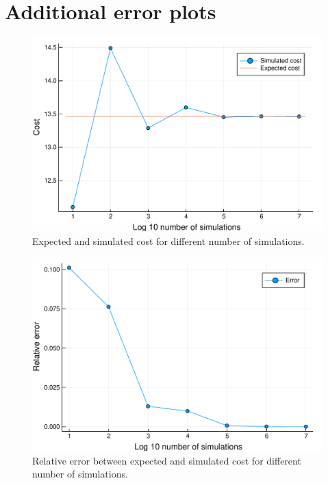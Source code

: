 \section{Additional error plots} %
\label{app:additional_error_plots}

\begin{figure}[H]
  \begin{center}
    \includegraphics[scale=0.41]{../img/board_unif_low/cost_iterations_log.pdf}
  \end{center}
  \caption{Expected and simulated cost for different number of simulations.}
  \label{fig:cost_iter_unif_low}
\end{figure}

\begin{figure}[H]
  \begin{center}
    \includegraphics[scale=0.41]{../img/board_unif_low/error_iterations_log.pdf}
  \end{center}
  \caption{Relative error between expected and simulated cost for different number of simulations.}
  \label{fig:error_iter_unif_low}
\end{figure}

